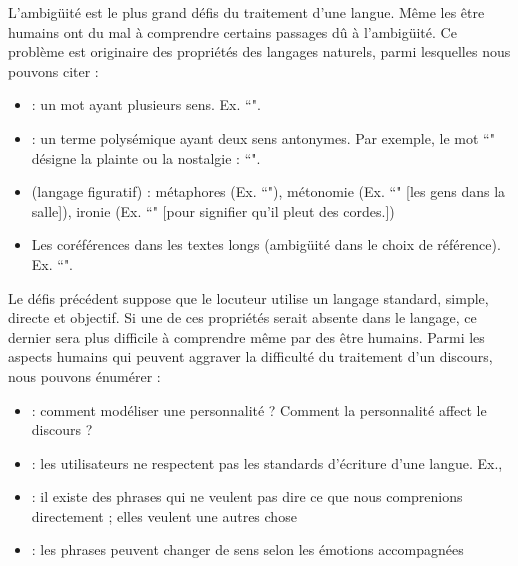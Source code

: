 \documentclass{KodeBook}
\begin{document}
L'ambigüité est le plus grand défis du traitement d'une langue. 
Même les être humains ont du mal à comprendre certains passages dû à l'ambigüité.
Ce problème est originaire des propriétés des langages naturels, parmi lesquelles nous pouvons citer :
\begin{itemize}
	\item {} : un mot ayant plusieurs sens. Ex. ``".
	\item {} : un terme polysémique ayant deux sens antonymes. Par exemple, le mot ``" désigne la plainte ou la nostalgie : ``".
	\item {} (langage figuratif) : métaphores (Ex. ``"), métonomie (Ex. ``" [les gens dans la salle]), ironie (Ex. ``" [pour signifier qu'il pleut des cordes.])
	\item Les coréférences dans les textes longs (ambigüité dans le choix de référence). 
	Ex. ``".
\end{itemize}

Le défis précédent suppose que le locuteur utilise un langage standard, simple, directe et objectif.
Si une de ces propriétés serait absente dans le langage, ce dernier sera plus difficile à comprendre même par des être humains.
Parmi les aspects humains qui peuvent aggraver la difficulté du traitement d'un discours, nous pouvons énumérer :
\begin{itemize}
	\item {} : comment modéliser une personnalité ? Comment la personnalité affect le discours ?
	\item {} : les utilisateurs ne respectent pas les standards d'écriture d'une langue. Ex., 
	\item {} : il existe des phrases qui ne veulent pas dire ce que nous comprenions directement ; elles veulent une autres chose
	\item {} : les phrases peuvent changer de sens selon les émotions accompagnées
\end{itemize}
\end{document}
